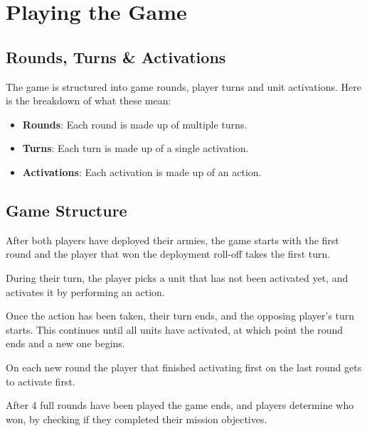 \documentclass[9pt, a4paper]{extarticle}            %
\begin{document}
\newpage



\section{Playing the Game}

\begin{multicols}{2}

\subsection{Rounds, Turns \& Activations}

The game is structured into game rounds, player turns and unit activations. Here is the breakdown of what these mean:

\begin{itemize}
  \item \textbf{Rounds}: Each round is made up of multiple turns.
  \item \textbf{Turns}: Each turn is made up of a single activation.
  \item \textbf{Activations}: Each activation is made up of an action.
\end{itemize}

\subsection{Game Structure}

After both players have deployed their armies, the game starts with the first round and the player that won the deployment roll-off takes the first turn.

During their turn, the player picks a unit that has not been activated yet, and activates it by performing an action.

Once the action has been taken, their turn ends, and the opposing player’s turn starts. This continues until all units have activated, at which point the round ends and a new one begins.

On each new round the player that finished activating first on the last round gets to activate first.

After 4 full rounds have been played the game ends, and players determine who won, by checking if they completed their mission objectives.


\end{multicols}
\end{document}
